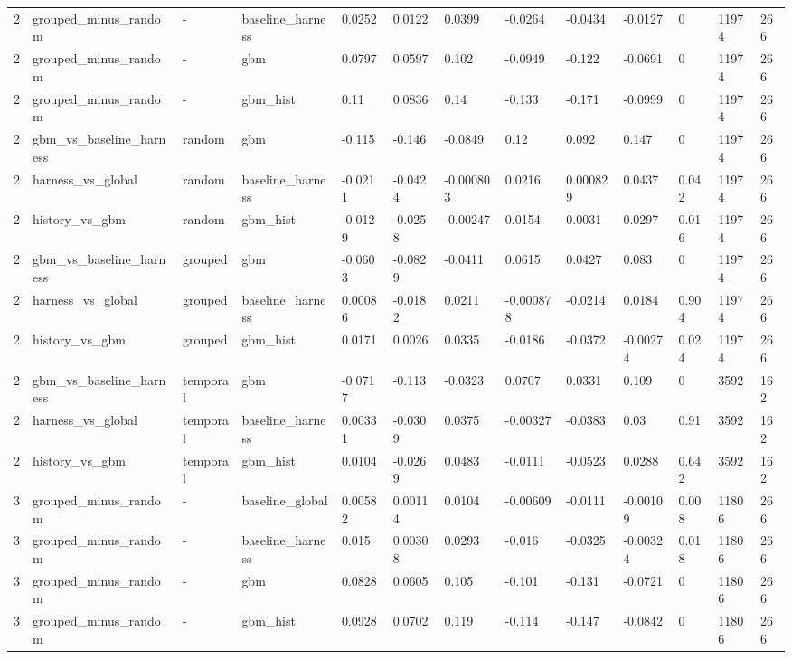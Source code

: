 \begin{tabular}{lllllllllllll}
2 & grouped\_minus\_random & - & baseline\_harness & 0.0252 & 0.0122 & 0.0399 & -0.0264 & -0.0434 & -0.0127 & 0 & 11974 & 266 \\
2 & grouped\_minus\_random & - & gbm & 0.0797 & 0.0597 & 0.102 & -0.0949 & -0.122 & -0.0691 & 0 & 11974 & 266 \\
2 & grouped\_minus\_random & - & gbm\_hist & 0.11 & 0.0836 & 0.14 & -0.133 & -0.171 & -0.0999 & 0 & 11974 & 266 \\
2 & gbm\_vs\_baseline\_harness & random & gbm & -0.115 & -0.146 & -0.0849 & 0.12 & 0.092 & 0.147 & 0 & 11974 & 266 \\
2 & harness\_vs\_global & random & baseline\_harness & -0.0211 & -0.0424 & -0.000803 & 0.0216 & 0.000829 & 0.0437 & 0.042 & 11974 & 266 \\
2 & history\_vs\_gbm & random & gbm\_hist & -0.0129 & -0.0258 & -0.00247 & 0.0154 & 0.0031 & 0.0297 & 0.016 & 11974 & 266 \\
2 & gbm\_vs\_baseline\_harness & grouped & gbm & -0.0603 & -0.0829 & -0.0411 & 0.0615 & 0.0427 & 0.083 & 0 & 11974 & 266 \\
2 & harness\_vs\_global & grouped & baseline\_harness & 0.00086 & -0.0182 & 0.0211 & -0.000878 & -0.0214 & 0.0184 & 0.904 & 11974 & 266 \\
2 & history\_vs\_gbm & grouped & gbm\_hist & 0.0171 & 0.0026 & 0.0335 & -0.0186 & -0.0372 & -0.00274 & 0.024 & 11974 & 266 \\
2 & gbm\_vs\_baseline\_harness & temporal & gbm & -0.0717 & -0.113 & -0.0323 & 0.0707 & 0.0331 & 0.109 & 0 & 3592 & 162 \\
2 & harness\_vs\_global & temporal & baseline\_harness & 0.00331 & -0.0309 & 0.0375 & -0.00327 & -0.0383 & 0.03 & 0.91 & 3592 & 162 \\
2 & history\_vs\_gbm & temporal & gbm\_hist & 0.0104 & -0.0269 & 0.0483 & -0.0111 & -0.0523 & 0.0288 & 0.642 & 3592 & 162 \\
3 & grouped\_minus\_random & - & baseline\_global & 0.00582 & 0.00114 & 0.0104 & -0.00609 & -0.0111 & -0.00109 & 0.008 & 11806 & 266 \\
3 & grouped\_minus\_random & - & baseline\_harness & 0.015 & 0.00308 & 0.0293 & -0.016 & -0.0325 & -0.00324 & 0.018 & 11806 & 266 \\
3 & grouped\_minus\_random & - & gbm & 0.0828 & 0.0605 & 0.105 & -0.101 & -0.131 & -0.0721 & 0 & 11806 & 266 \\
3 & grouped\_minus\_random & - & gbm\_hist & 0.0928 & 0.0702 & 0.119 & -0.114 & -0.147 & -0.0842 & 0 & 11806 & 266 \\

\end{tabular}
